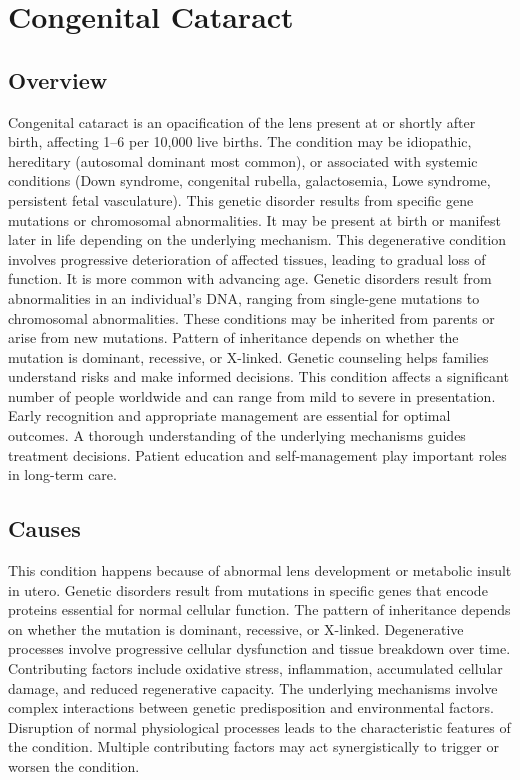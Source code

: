 \chapter{Congenital Cataract}
\label{sec:Congenital Cataract}

\section{Overview}
Congenital cataract is an opacification of the lens present at or shortly after birth, affecting 1--6 per 10,000 live births. The condition may be idiopathic, hereditary (autosomal dominant most common), or associated with systemic conditions (Down syndrome, congenital rubella, galactosemia, Lowe syndrome, persistent fetal vasculature). This genetic disorder results from specific gene mutations or chromosomal abnormalities. It may be present at birth or manifest later in life depending on the underlying mechanism. This degenerative condition involves progressive deterioration of affected tissues, leading to gradual loss of function. It is more common with advancing age. Genetic disorders result from abnormalities in an individual's DNA, ranging from single-gene mutations to chromosomal abnormalities. These conditions may be inherited from parents or arise from new mutations. Pattern of inheritance depends on whether the mutation is dominant, recessive, or X-linked. Genetic counseling helps families understand risks and make informed decisions. This condition affects a significant number of people worldwide and can range from mild to severe in presentation. Early recognition and appropriate management are essential for optimal outcomes. A thorough understanding of the underlying mechanisms guides treatment decisions. Patient education and self-management play important roles in long-term care.
\section{Causes}
This condition happens because of abnormal lens development or metabolic insult in utero. Genetic disorders result from mutations in specific genes that encode proteins essential for normal cellular function. The pattern of inheritance depends on whether the mutation is dominant, recessive, or X-linked. Degenerative processes involve progressive cellular dysfunction and tissue breakdown over time. Contributing factors include oxidative stress, inflammation, accumulated cellular damage, and reduced regenerative capacity. The underlying mechanisms involve complex interactions between genetic predisposition and environmental factors. Disruption of normal physiological processes leads to the characteristic features of the condition. Multiple contributing factors may act synergistically to trigger or worsen the condition.
